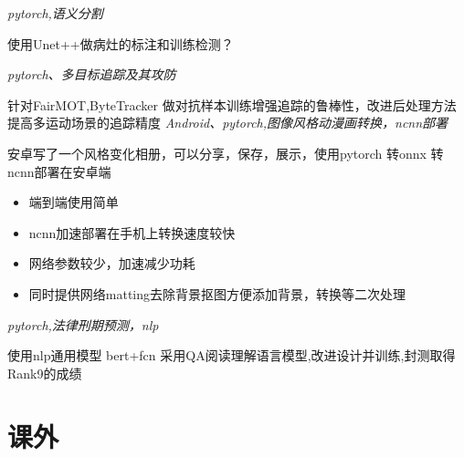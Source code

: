 \documentclass{uniquecv}
\begin{document}
\textit{pytorch,语义分割}
\vspace{0.4ex}

使用Unet++做病灶的标注和训练检测？

\textit{pytorch、多目标追踪及其攻防}
\vspace{0.4ex}

针对FairMOT,ByteTracker 做对抗样本训练增强追踪的鲁棒性，改进后处理方法提高多运动场景的追踪精度
\textit{Android、pytorch,图像风格动漫画转换，ncnn部署}
\vspace{0.4ex}

安卓写了一个风格变化相册，可以分享，保存，展示，使用pytorch 转onnx 转 ncnn部署在安卓端
\begin{itemize}
  \item 端到端使用简单
  \item ncnn加速部署在手机上转换速度较快
  \item 网络参数较少，加速减少功耗
  \item 同时提供网络matting去除背景抠图方便添加背景，转换等二次处理
\end{itemize}
\textit{pytorch,法律刑期预测，nlp}
\vspace{0.4ex}

使用nlp通用模型 bert+fcn 采用QA阅读理解语言模型,改进设计并训练,封测取得Rank9的成绩

\section{课外}
\end{document}

